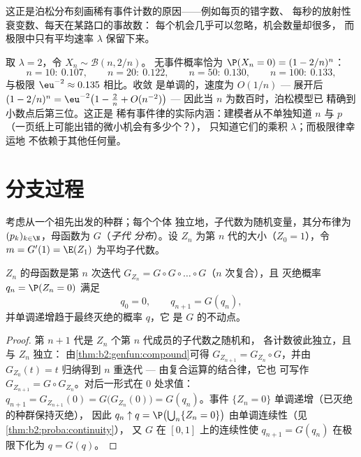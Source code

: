 \begin{remark}
这正是泊松分布刻画稀有事件计数的原因——例如每页的错字数、
每秒的放射性衰变数、每天在某路口的事故数：
每个机会几乎可以忽略，机会数量却很多，
而极限中只有平均速率 $\lambda$ 保留下来。
\end{remark}

\begin{example}\label{ex:b2:genfun:poissonnumerics}
取 $\lambda = 2$，令 $X_n \sim \mathcal B(n, 2/n)$。
无事件概率恰为 $\P(X_n = 0) = (1 - 2/n)^n$：
\[
n = 10:\ 0.107, \qquad
n = 20:\ 0.122, \qquad
n = 50:\ 0.130, \qquad
n = 100:\ 0.133,
\]
与极限 $\eu^{-2} \approx 0.135$ 相比。收敛
是单调的，速度为 $O(1/n)$ --- 展开后 $(1 -
2/n)^n = \eu^{-2}\bigl(1 - \tfrac2n + O(n^{-2})\bigr)$ ---
因此当 $n$ 为数百时，泊松模型已
精确到小数点后第三位。这正是
稀有事件律的实际内涵：建模者从不单独知道 $n$ 与
$p$（一页纸上可能出错的微小机会有多少个？），
只知道它们的乘积 $\lambda$；而极限律幸运地
不依赖于其他任何量。
\end{example}

\section{分支过程}

考虑从一个祖先出发的种群；每个个体
独立地，子代数为随机变量，其分布律为 $(p_k)_{k
\in \N}$，母函数为 $G$（\emph{子代
分布}）。设 $Z_n$ 为第 $n$ 代的大小（$Z_0 =
1$），令 $m = G'(1) = \E(Z_1)$ 为平均子代数。

\begin{proposition}\label{prop:b2:genfun:branching}
$Z_n$ 的母函数是第 $n$ 次迭代
$G_{Z_n} = G \circ G \circ \dots \circ G$（$n$ 次复合），且
灭绝概率 $q_n = \P(Z_n = 0)$ 满足
\[
q_0 = 0, \qquad q_{n+1} = G(q_n),
\]
并单调递增趋于最终灭绝的概率 $q$，它
是 $G$ 的不动点。
\end{proposition}

\begin{proof}
第 $n + 1$ 代是 $Z_n$ 个第 $n$ 代成员的子代数之随机和，
各计数彼此独立，且与 $Z_n$ 独立：
由\cref{thm:b2:genfun:compound}可得 $G_{Z_{n+1}} =
G_{Z_n} \circ G$，并由 $G_{Z_0}(t) = t$ 归纳得到
$n$ 重迭代 --- 由复合运算的结合律，它也
可写作 $G_{Z_{n+1}} = G \circ G_{Z_n}$。对后一形式在
$0$ 处求值：$q_{n+1} = G_{Z_{n+1}}(0) =
G\bigl(G_{Z_n}(0)\bigr) = G(q_n)$。事件 $\{Z_n = 0\}$ 单调递增（已灭绝的种群保持灭绝），
因此 $q_n \uparrow q = \P\bigl(\bigcup_n\{Z_n = 0\}\bigr)$
由单调连续性（见\cref{thm:b2:proba:continuity}），
又 $G$ 在 $[0, 1]$ 上的连续性使 $q_{n+1} = G(q_n)$ 在极限下化为 $q =
G(q)$。
\end{proof}

